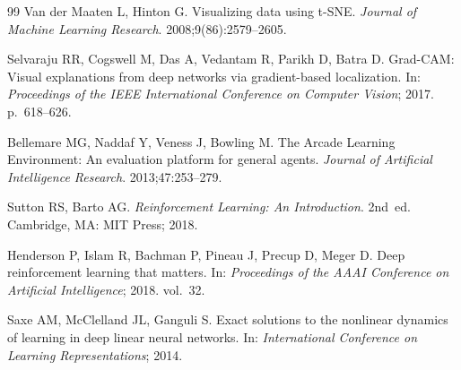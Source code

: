 \documentclass[a4paper]{article}
\begin{document}
\begin{thebibliography}{99}
Van der Maaten L, Hinton G.
Visualizing data using t-SNE.
\textit{Journal of Machine Learning Research}. 2008;9(86):2579--2605.

Selvaraju RR, Cogswell M, Das A, Vedantam R, Parikh D, Batra D.
Grad-CAM: Visual explanations from deep networks via gradient-based localization.
In: \textit{Proceedings of the IEEE International Conference on Computer Vision}; 2017. p.~618--626.

Bellemare MG, Naddaf Y, Veness J, Bowling M.
The Arcade Learning Environment: An evaluation platform for general agents.
\textit{Journal of Artificial Intelligence Research}. 2013;47:253--279.

Sutton RS, Barto AG.
\textit{Reinforcement Learning: An Introduction}. 2nd~ed.
Cambridge, MA: MIT Press; 2018.

Henderson P, Islam R, Bachman P, Pineau J, Precup D, Meger D.
Deep reinforcement learning that matters.
In: \textit{Proceedings of the AAAI Conference on Artificial Intelligence}; 2018. vol.~32.

Saxe AM, McClelland JL, Ganguli S.
Exact solutions to the nonlinear dynamics of learning in deep linear neural networks.
In: \textit{International Conference on Learning Representations}; 2014.

\end{thebibliography}
\end{document}
